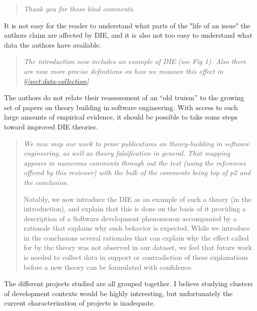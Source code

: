 \documentclass[smallcondensed]{svjour3}
\newcommand{\tion}[1]{\S\ref{sect:#1}}
\begin{document}
\begin{quote}{\em Thank you for those kind comments.}\end{quote}

It is not easy for the reader to understand what parts
of the "life of an issue" the authors claim are affected by
DIE, and it is also not too easy to understand what data the
authors have available.  

\begin{quote}{\em  The introduction now includes an example of DIE  (see Fig 1).
Also there are now more precise  definitions on how we measure this effect in \tion{data-collection}}\end{quote}
 
 The authors do not relate their reassessment of an
``old truism'' to the growing set of papers on theory building
in software engineering. With access to such large amounts
of empirical evidence, it should be possible to take some
steps toward improved DIE theories. 

\begin{quote}{\em We now map our work to prior publications on theory-building in software engineering, as well as theory falsification in general. That mapping appears in numerous comments through out the text (using the references offered by this reviewer) with the bulk of the comments being top of p2 and the conclusion. 

Notably, we now introduce the DIE as an example of such a theory (in the introduction), and explain that this is done on the basis of it providing a description of a Software development phenomenon accompanied by a rationale that explains why such behavior is expected. While we introduce in the conclusions several rationales that can explain why the effect called for by the theory was not observed in our dataset, we feel that future work is needed to collect data in support or contradiction of these explanations before a new theory can be formulated with confidence. }\end{quote}

The different projects studied are all grouped together. I
believe studying clusters of development contexts would be
highly interesting, but unfortunately the current
characterization of projects is inadequate.  
\end{document}
